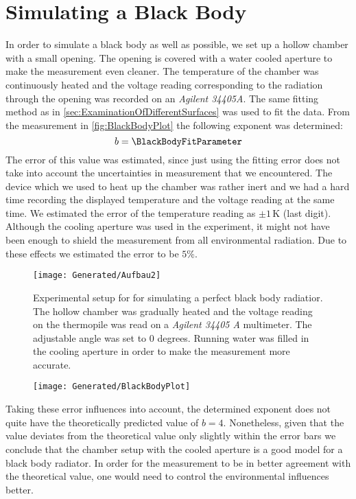 \documentclass[a4paper,10pt,twocolumn]{article}
\begin{document}
    \section{Simulating a Black Body}\label{sec:BlackBodyRadiation}
    In order to simulate a black body as well as possible, we set up a hollow chamber with a small opening.
    The opening is covered with a water cooled aperture to make the measurement even cleaner.
    The temperature of the chamber was continuously heated and the voltage reading corresponding to the radiation through the opening was recorded on an \textit{Agilent 34405A}.
    The same fitting method as in \autoref{sec:ExaminationOfDifferentSurfaces} was used to fit the data.
    From the measurement in \autoref{fig:BlackBodyPlot} the following exponent was determined:
    \begin{equation}
        b = \BlackBodyFitParameter
    \end{equation}
    The error of this value was estimated, since just using the fitting error does not take into account the uncertainties in measurement that we encountered.
    The device which we used to heat up the chamber was rather inert and we had a hard time recording the displayed temperature and the voltage reading at the same time.
    We estimated the error of the temperature reading as $\pm 1\,$K (last digit).
    Although the cooling aperture was used in the experiment, it might not have been enough to shield the measurement from all environmental radiation.
    Due to these effects we estimated the error to be $5\%$\).
    \begin{figure}
        \begin{center}
            \texttt{[image: Generated/Aufbau2]}
            \caption{Experimental setup for for simulating a perfect black body radiatior. The hollow chamber was gradually heated 
            and the voltage reading on the thermopile was read on a \textit{Agilent 34405 A} multimeter. The adjustable angle was set to 0 degrees.
            Running water was filled in the cooling aperture in order to make the measurement more accurate.}
            \label{fig:Aufbau2}
        \end{center}
    \end{figure}
    \begin{figure}
        \begin{center}
            \texttt{[image: Generated/BlackBodyPlot]}
            \caption{}
            \label{fig:BlackBodyPlot}
        \end{center}
    \end{figure}
    Taking these error influences into account, the determined exponent does not quite have the theoretically predicted value of $b = 4 $.
    Nonetheless, given that the value deviates from the theoretical value only slightly within the error bars we conclude that the chamber setup with the cooled aperture
    is a good model for a black body radiator.
    In order for the measurement to be in better agreement with the theoretical value, one would need to control the environmental influences better. 
    
\end{document}
